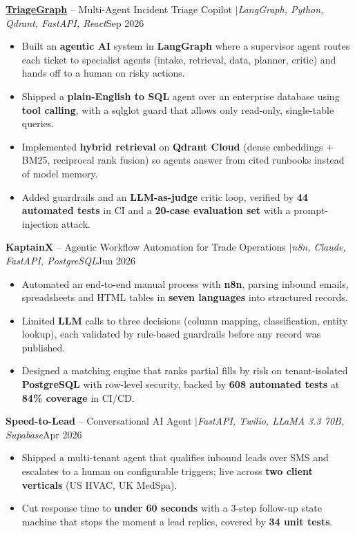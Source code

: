 \documentclass[a4paper,10pt]{article}
\newcommand{\entrygap}{\vspace{4pt}}
\newcommand{\sep}{\unskip\hspace{0.5em}$|$\hspace{0.5em}\ignorespaces}
\newlength{\entryindent}\setlength{\entryindent}{10pt}
\newcommand{\entry}[2]{\hspace*{\entryindent}#1\hfill #2\par}
\begin{document}
\entry{\href{https://github.com/dhruubb/triagegraph}{\textbf{TriageGraph}} -- Multi-Agent Incident Triage Copilot \sep \textit{LangGraph, Python, Qdrant, FastAPI, React}}{Sep 2026}
\begin{itemize}
    \item Built an \textbf{agentic AI} system in \textbf{LangGraph} where a supervisor agent routes each ticket to specialist agents (intake, retrieval, data, planner, critic) and hands off to a human on risky actions.
    \item Shipped a \textbf{plain-English to SQL} agent over an enterprise database using \textbf{tool calling}, with a sqlglot guard that allows only read-only, single-table queries.
    \item Implemented \textbf{hybrid retrieval} on \textbf{Qdrant Cloud} (dense embeddings + BM25, reciprocal rank fusion) so agents answer from cited runbooks instead of model memory.
    \item Added guardrails and an \textbf{LLM-as-judge} critic loop, verified by \textbf{44 automated tests} in CI and a \textbf{20-case evaluation set} with a prompt-injection attack.
\end{itemize}
\entrygap
\entry{\textbf{KaptainX} -- Agentic Workflow Automation for Trade Operations \sep \textit{n8n, Claude, FastAPI, PostgreSQL}}{Jun 2026}
\begin{itemize}
    \item Automated an end-to-end manual process with \textbf{n8n}, parsing inbound emails, spreadsheets and HTML tables in \textbf{seven languages} into structured records.
    \item Limited \textbf{LLM} calls to three decisions (column mapping, classification, entity lookup), each validated by rule-based guardrails before any record was published.
    \item Designed a matching engine that ranks partial fills by risk on tenant-isolated \textbf{PostgreSQL} with row-level security, backed by \textbf{608 automated tests} at \textbf{84\% coverage} in CI/CD.
\end{itemize}
\entrygap
\entry{\textbf{Speed-to-Lead} -- Conversational AI Agent \sep \textit{FastAPI, Twilio, LLaMA 3.3 70B, Supabase}}{Apr 2026}
\begin{itemize}
    \item Shipped a multi-tenant agent that qualifies inbound leads over SMS and escalates to a human on configurable triggers; live across \textbf{two client verticals} (US HVAC, UK MedSpa).
    \item Cut response time to \textbf{under 60 seconds} with a 3-step follow-up state machine that stops the moment a lead replies, covered by \textbf{34 unit tests}.
\end{itemize}
\end{document}
